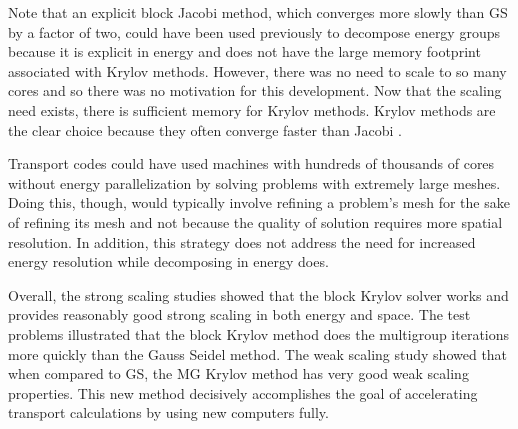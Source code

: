 Note that an explicit block Jacobi method, which converges more slowly than GS by a factor of two, could have been used previously to decompose energy groups because it is explicit in energy and does not have the large memory footprint associated with Krylov methods. However, there was no need to scale to so many cores and so there was no motivation for this development. Now that the scaling need exists, there is sufficient memory for Krylov methods. Krylov methods are the clear choice because they often converge faster than Jacobi \cite{LeVeque2007}. 

Transport codes could have used machines with hundreds of thousands of cores without energy parallelization by solving problems with extremely large meshes. Doing this, though, would typically involve refining a problem's mesh for the sake of refining its mesh and not because the quality of solution requires more spatial resolution. In addition, this strategy does not address the need for increased energy resolution while decomposing in energy does. 

Overall, the strong scaling studies showed that the block Krylov solver works and provides reasonably good strong scaling in both energy and space. The test problems illustrated that the block Krylov method does the multigroup iterations more quickly than the Gauss Seidel method. The weak scaling study showed that when compared to GS, the MG Krylov method has very good weak scaling properties. This new method decisively accomplishes the goal of accelerating transport calculations by using new computers fully.

\separatorpage{}
